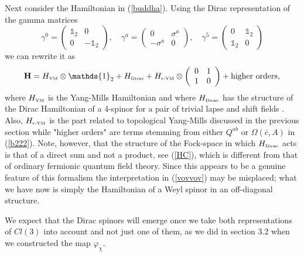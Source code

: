 \documentclass[letterpaper,11pt]{article}
\def\OO{\Omega}
\begin{document}
Next consider the Hamiltonian in (\ref{buddha}). Using the Dirac representation of the gamma matrices
$$
\gamma^0 =
 \left(\begin{array}{cc}
\mathds{1}_2 & 0\\
0 & -\mathds{1}_2
\end{array}\right), 
\quad
\gamma^a =
 \left(\begin{array}{cc}
0 &  \sigma^a\\
-  \sigma^a & 0
\end{array}\right),
\quad
\gamma^5=
 \left(\begin{array}{cc}
0 & \mathds{1}_2\\
\mathds{1}_2 & 0
\end{array}\right)
$$
we can rewrite it as
\begin{equation}
{\mathbf{H}} = H_{\mbox{\tiny YM}} \otimes \mathds{1}_2 + H_{\mbox{\tiny Dirac}} + H_{\mbox{\tiny t-YM}} \otimes \left(\begin{array}{cc}
0&1 \\
  1 & 0
\end{array}\right)  + \mbox{higher orders},
\label{vovvov}
\end{equation}
where $H_{\mbox{\tiny YM}}$ is the Yang-Mills Hamiltonian and where $H_{\mbox{\tiny Dirac}}$ has the structure of the Dirac Hamiltonian of a 4-spinor for a pair of trivial lapse and shift fields \cite{Paschke}. Also, $H_{\mbox{\tiny t-YM}}$ is the part related to topological Yang-Mills discussed in the previous section while "higher orders" are terms stemming from either $Q^{ab}$ or $\OO(\bar{c},A)$ in (\ref{b222}).
Note, however, that the structure of the Fock-space in which $H_{\mbox{\tiny Dirac}}$ acts is that of a direct sum and not a product, see (\ref{HC}), which is different from that of ordinary fermionic quantum field theory. Since this appears to be a genuine feature of this formalism the interpretation in (\ref{vovvov}) may be misplaced; what we have now is simply the Hamiltonian of a Weyl spinor in an off-diagonal structure. 

We expect that the Dirac spinors will emerge once we take both representations of $Cl(3)$ into account and not just one of them, as we did in section 3.2 when we constructed the map $\varphi_\chi$.
\end{document}

